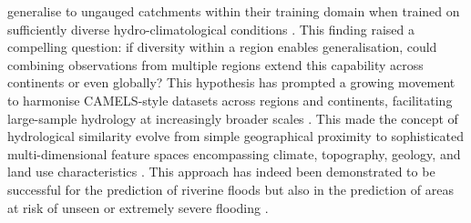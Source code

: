 generalise to ungauged catchments within their training domain when trained on sufficiently diverse hydro-climatological conditions \citep{Kratzert_2019}. This finding raised a compelling question: if diversity within a region enables generalisation, could combining observations from multiple regions extend this capability across continents or even globally? This hypothesis has prompted a growing movement to harmonise CAMELS-style datasets across regions and continents, facilitating large-sample hydrology at increasingly broader scales \citep{Clerc-Schwarzenbach_2024}. This made the concept of hydrological similarity evolve from simple geographical proximity to sophisticated multi-dimensional feature spaces encompassing climate, topography, geology, and land use characteristics \citep{Addor_2020}. This approach has indeed been demonstrated to be successful for the prediction of riverine floods \citep{Nearing_2024} but also in the prediction of areas at risk of unseen or extremely severe flooding \citep{Bertola_2023}.

